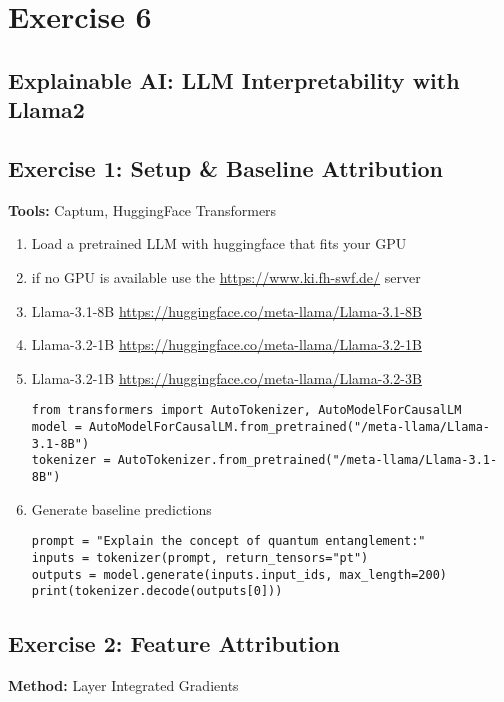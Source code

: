 \chapter*{Exercise 6}
\section*{Explainable AI: LLM Interpretability with Llama2}

\section*{Exercise 1: Setup \& Baseline Attribution}
\textbf{Tools:} Captum, HuggingFace Transformers

\begin{enumerate}
\item Load a pretrained LLM with huggingface that fits your GPU
\item if no GPU is available use the \url{https://www.ki.fh-swf.de/} server
\item Llama-3.1-8B \url{https://huggingface.co/meta-llama/Llama-3.1-8B}
\item Llama-3.2-1B \url{https://huggingface.co/meta-llama/Llama-3.2-1B}
\item Llama-3.2-1B \url{https://huggingface.co/meta-llama/Llama-3.2-3B}
\begin{verbatim}
from transformers import AutoTokenizer, AutoModelForCausalLM
model = AutoModelForCausalLM.from_pretrained("/meta-llama/Llama-3.1-8B")
tokenizer = AutoTokenizer.from_pretrained("/meta-llama/Llama-3.1-8B")
\end{verbatim}

\item Generate baseline predictions
\begin{verbatim}
prompt = "Explain the concept of quantum entanglement:"
inputs = tokenizer(prompt, return_tensors="pt")
outputs = model.generate(inputs.input_ids, max_length=200)
print(tokenizer.decode(outputs[0]))
\end{verbatim}
\end{enumerate}

\section*{Exercise 2: Feature Attribution}
\textbf{Method:} Layer Integrated Gradients

